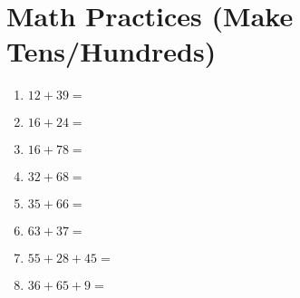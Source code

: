 \documentclass[a4paper,12pt]{article}
\begin{document}
\section*{\huge \center\textbf{Math Practices (Make Tens/Hundreds)}}
\vspace{1 cm}
\begin{multicols}{2}
\begin{enumerate}[label=\arabic*.]
    \item \textbf{\Large $12 + 39 =$} \underline{\hspace{2cm}} \vspace{4.5cm}
    \item \textbf{\Large $16 + 24 =$} \underline{\hspace{2cm}} \vspace{4.5cm}
    \item \textbf{\Large $16 + 78 =$} \underline{\hspace{2cm}} \vspace{4.5cm}
    \item \textbf{\Large $32 + 68 =$} \underline{\hspace{2cm}} \vspace{4.5cm}
    \item \textbf{\Large $35 + 66 =$} \underline{\hspace{2cm}} \vspace{4.5cm}
    \item \textbf{\Large $63 + 37 =$} \underline{\hspace{2cm}} \vspace{4.5cm}
    \item \textbf{\Large $55 + 28 + 45 =$} \underline{\hspace{2cm}} \vspace{4.5cm}
    \item \textbf{\Large $36 + 65 + 9 =$} \underline{\hspace{2cm}} \vspace{4.5cm}
\end{enumerate}
\end{multicols}


\newpage
\end{document}
